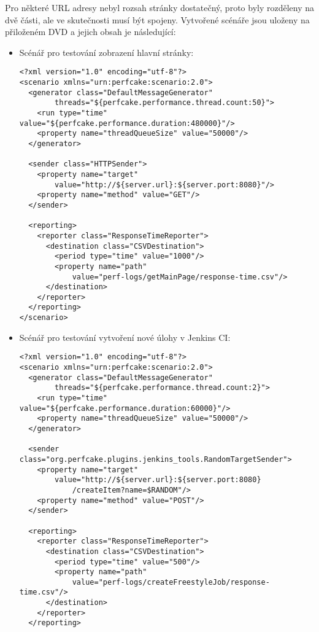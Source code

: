     Pro některé URL adresy nebyl rozsah stránky dostatečný, proto byly
    rozděleny na dvě části, ale ve skutečnosti musí být spojeny.
    Vytvořené scénáře jsou uloženy na přiloženém DVD a jejich obsah je následující:
       \begin{itemize}
        \item Scénář pro testování zobrazení hlavní stránky:
\begin{verbatim}
<?xml version="1.0" encoding="utf-8"?>
<scenario xmlns="urn:perfcake:scenario:2.0">
  <generator class="DefaultMessageGenerator" 
        threads="${perfcake.performance.thread.count:50}">
    <run type="time" value="${perfcake.performance.duration:480000}"/>
    <property name="threadQueueSize" value="50000"/>
  </generator>
  
  <sender class="HTTPSender">
    <property name="target" 
        value="http://${server.url}:${server.port:8080}"/>
    <property name="method" value="GET"/>                                                                                               
  </sender>
  
  <reporting>
    <reporter class="ResponseTimeReporter">
      <destination class="CSVDestination">
        <period type="time" value="1000"/>
        <property name="path" 
            value="perf-logs/getMainPage/response-time.csv"/>
      </destination>
    </reporter>
  </reporting>
</scenario>
\end{verbatim}

        \newpage
        \item Scénář pro testování vytvoření nové úlohy v Jenkins CI:
\begin{verbatim}
<?xml version="1.0" encoding="utf-8"?>
<scenario xmlns="urn:perfcake:scenario:2.0">
  <generator class="DefaultMessageGenerator" 
        threads="${perfcake.performance.thread.count:2}">
    <run type="time" value="${perfcake.performance.duration:60000}"/>                                                                         
    <property name="threadQueueSize" value="50000"/>                                                                                         
  </generator>
              
  <sender class="org.perfcake.plugins.jenkins_tools.RandomTargetSender">
    <property name="target" 
        value="http://${server.url}:${server.port:8080}
            /createItem?name=$RANDOM"/>
    <property name="method" value="POST"/>
  </sender>

  <reporting>
    <reporter class="ResponseTimeReporter">
      <destination class="CSVDestination">
        <period type="time" value="500"/>
        <property name="path" 
            value="perf-logs/createFreestyleJob/response-time.csv"/>
      </destination>
    </reporter>
  </reporting>
    

\end{verbatim}
\end{itemize}
